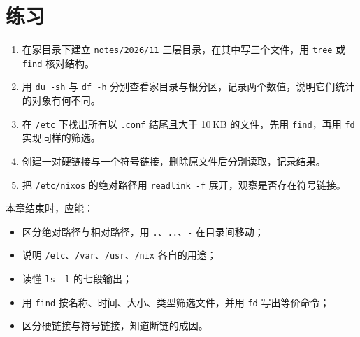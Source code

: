 \section{练习}

\begin{enumerate}
  \item 在家目录下建立 \texttt{notes/2026/11} 三层目录，在其中写三个文件，用 \texttt{tree} 或 \texttt{find} 核对结构。
  \item 用 \texttt{du -sh} 与 \texttt{df -h} 分别查看家目录与根分区，记录两个数值，说明它们统计的对象有何不同。
  \item 在 \texttt{/etc} 下找出所有以 \texttt{.conf} 结尾且大于 10\,KB 的文件，先用 \texttt{find}，再用 \texttt{fd} 实现同样的筛选。
  \item 创建一对硬链接与一个符号链接，删除原文件后分别读取，记录结果。
  \item 把 \texttt{/etc/nixos} 的绝对路径用 \texttt{readlink -f} 展开，观察是否存在符号链接。
\end{enumerate}

\begin{checkpoint}
本章结束时，应能：
\begin{itemize}
  \item 区分绝对路径与相对路径，用 \texttt{.}、\texttt{..}、\texttt{-} 在目录间移动；
  \item 说明 \texttt{/etc}、\texttt{/var}、\texttt{/usr}、\texttt{/nix} 各自的用途；
  \item 读懂 \texttt{ls -l} 的七段输出；
  \item 用 \texttt{find} 按名称、时间、大小、类型筛选文件，并用 \texttt{fd} 写出等价命令；
  \item 区分硬链接与符号链接，知道断链的成因。
\end{itemize}
\end{checkpoint}

